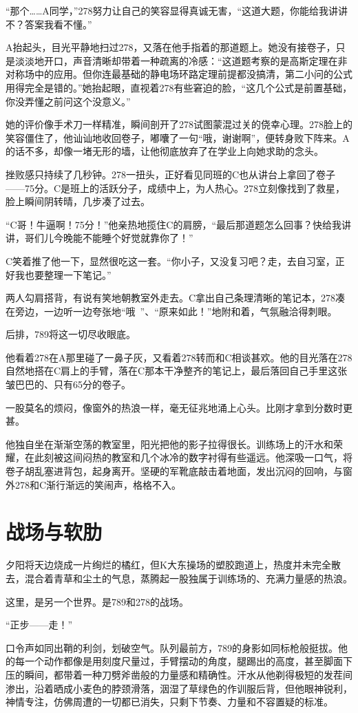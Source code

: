 \documentclass[a4paper]{book}
\begin{document}
“那个……A同学，”278努力让自己的笑容显得真诚无害，“这道大题，你能给我讲讲不？答案我看不懂。”

A抬起头，目光平静地扫过278，又落在他手指着的那道题上。她没有接卷子，只是淡淡地开口，声音清晰却带着一种疏离的冷感：“这道题考察的是高斯定理在非对称场中的应用。但你连最基础的静电场环路定理前提都没搞清，第二小问的公式用得完全是错的。”她抬起眼，直视着278有些窘迫的脸，“这几个公式是前置基础，你没弄懂之前问这个没意义。”

她的评价像手术刀一样精准，瞬间剖开了278试图蒙混过关的侥幸心理。278脸上的笑容僵住了，他讪讪地收回卷子，嘟囔了一句“哦，谢谢啊”，便转身败下阵来。A的话不多，却像一堵无形的墙，让他彻底放弃了在学业上向她求助的念头。

挫败感只持续了几秒钟。278一扭头，正好看见同班的C也从讲台上拿回了卷子——75分。C是班上的活跃分子，成绩中上，为人热心。278立刻像找到了救星，脸上瞬间阴转晴，几步凑了过去。

“C哥！牛逼啊！75分！”他亲热地揽住C的肩膀，“最后那道题怎么回事？快给我讲讲，哥们儿今晚能不能睡个好觉就靠你了！”

C笑着推了他一下，显然很吃这一套。“你小子，又没复习吧？走，去自习室，正好我也要整理一下笔记。”

两人勾肩搭背，有说有笑地朝教室外走去。C拿出自己条理清晰的笔记本，278凑在旁边，一边听一边夸张地“哦~”、“原来如此！”地附和着，气氛融洽得刺眼。

后排，789将这一切尽收眼底。

他看着278在A那里碰了一鼻子灰，又看着278转而和C相谈甚欢。他的目光落在278自然地搭在C肩上的手臂，落在C那本干净整齐的笔记上，最后落回自己手里这张皱巴巴的、只有65分的卷子。

一股莫名的烦闷，像窗外的热浪一样，毫无征兆地涌上心头。比刚才拿到分数时更甚。

他独自坐在渐渐空荡的教室里，阳光把他的影子拉得很长。训练场上的汗水和荣耀，在此刻被这间闷热的教室和几个冰冷的数字衬得有些遥远。他深吸一口气，将卷子胡乱塞进背包，起身离开。坚硬的军靴底敲击着地面，发出沉闷的回响，与窗外278和C渐行渐远的笑闹声，格格不入。
\normalsize
\section{战场与软肋}
\songti{}
夕阳将天边烧成一片绚烂的橘红，但K大东操场的塑胶跑道上，热度并未完全散去，混合着青草和尘土的气息，蒸腾起一股独属于训练场的、充满力量感的热浪。

这里，是另一个世界。是789和278的战场。

“正步——走！”

口令声如同出鞘的利剑，划破空气。队列最前方，789的身影如同标枪般挺拔。他的每一个动作都像是用刻度尺量过，手臂摆动的角度，腿踢出的高度，甚至脚面下压的瞬间，都带着一种刀劈斧凿般的力量感和精确性。汗水从他剃得极短的发茬间渗出，沿着晒成小麦色的脖颈滑落，洇湿了草绿色的作训服后背，但他眼神锐利，神情专注，仿佛周遭的一切都已消失，只剩下节奏、力量和不容置疑的标准。
\end{document}
